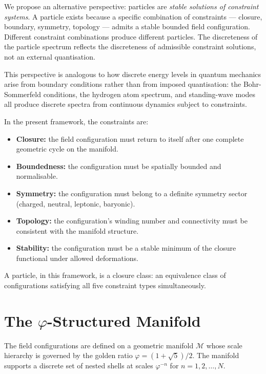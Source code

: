 \documentclass[12pt]{article}
\newcommand{\Mcal}{\mathcal{M}}
\newcommand{\phig}{\varphi}
\begin{document}
We propose an alternative perspective: particles are \textit{stable solutions of constraint systems}. A particle exists because a specific combination of constraints --- closure, boundary, symmetry, topology --- admits a stable bounded field configuration. Different constraint combinations produce different particles. The discreteness of the particle spectrum reflects the discreteness of admissible constraint solutions, not an external quantisation.

This perspective is analogous to how discrete energy levels in quantum mechanics arise from boundary conditions rather than from imposed quantisation: the Bohr-Sommerfeld conditions, the hydrogen atom spectrum, and standing-wave modes all produce discrete spectra from continuous dynamics subject to constraints.

In the present framework, the constraints are:
\begin{itemize}
    \item \textbf{Closure:} the field configuration must return to itself after one complete geometric cycle on the manifold.
    \item \textbf{Boundedness:} the configuration must be spatially bounded and normalisable.
    \item \textbf{Symmetry:} the configuration must belong to a definite symmetry sector (charged, neutral, leptonic, baryonic).
    \item \textbf{Topology:} the configuration's winding number and connectivity must be consistent with the manifold structure.
    \item \textbf{Stability:} the configuration must be a stable minimum of the closure functional under allowed deformations.
\end{itemize}

A particle, in this framework, is a closure class: an equivalence class of configurations satisfying all five constraint types simultaneously.

\section{The $\phig$-Structured Manifold}\label{sec:manifold}

The field configurations are defined on a geometric manifold $\Mcal$ whose scale hierarchy is governed by the golden ratio $\phig = (1+\sqrt{5})/2$. The manifold supports a discrete set of nested shells at scales $\phig^{-n}$ for $n = 1, 2, \ldots, N$.
\end{document}
